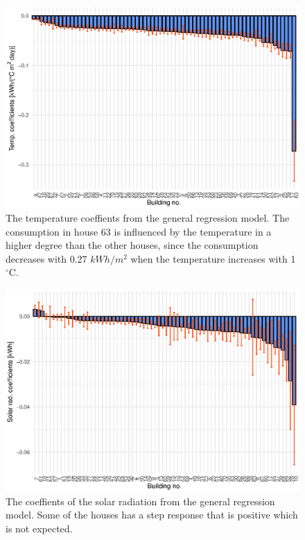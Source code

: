 \begin{figure}
    \centering
    \includegraphics[width=1.\textwidth]{../../../figures/Temp_coef.eps}
    \caption{The temperature coeffients from the general regression model. The consumption in house 63 is influenced by the temperature in a higher degree than the other houses, since the consumption decreases with 0.27 $kWh/m^2$ when the temperature increases with 1 $^{\circ}$C.}
    \label{fig: Temp_coef}
\end{figure}
\begin{figure}
    \centering
    \includegraphics[width=1.\textwidth]{../../../figures/Solar_coef.eps}
    \caption{The coeffients of the solar radiation from the general regression model. Some of the houses has a step response that is positive which is not expected.}
    \label{fig: Solar_coef}
\end{figure}

